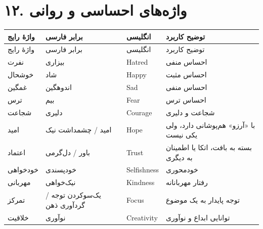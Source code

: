 \documentclass[a4paper,12pt,openany]{book}
\begin{document}
\section*{۱۲. واژه‌های احساسی و روانی}
\begingroup
\small
\setlength{\tabcolsep}{4pt}
\renewcommand{\arraystretch}{1.25}
\begin{longtable}{|p{2.5cm}|p{4.0cm}|p{2.3cm}|p{5.3cm}|}
\hline
واژهٔ رایج & برابر فارسی & انگلیسی & توضیح کاربرد \\
\hline
\endfirsthead
\hline
واژهٔ رایج & برابر فارسی & انگلیسی & توضیح کاربرد \\
\hline
\endhead
نفرت & بیزاری & \textenglish{Hatred} & احساس منفی \\
خوشحال & شاد & \textenglish{Happy} & احساس مثبت \\
غمگین & اندوهگین & \textenglish{Sad} & احساس منفی \\
ترس & بیم & \textenglish{Fear} & احساس ترس \\
شجاعت & دلیری & \textenglish{Courage} & شجاعت و دلیری \\
امید & امید / چشمداشت نیک & \textenglish{Hope} & با «آرزو» هم‌پوشانی دارد، ولی یکی نیست \\
اعتماد & باور / دل‌گرمی & \textenglish{Trust} & بسته به بافت، اتکا یا اطمینان به دیگری \\
خودخواهی & خودپسندی & \textenglish{Selfishness} & خودمحوری \\
مهربانی & نیک‌خواهی & \textenglish{Kindness} & رفتار مهربانانه \\
تمرکز & یک‌سوکردن توجه / گردآوری ذهن & \textenglish{Focus} & توجه پایدار به یک موضوع \\
خلاقیت & نوآوری & \textenglish{Creativity} & توانایی ابداع و نوآوری \\
\hline
\end{longtable}
\endgroup
\end{document}
